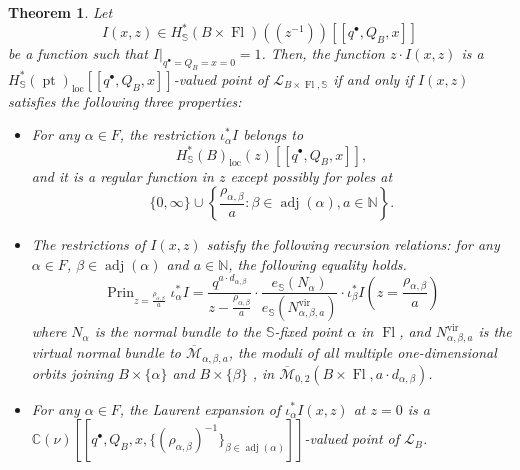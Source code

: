 \documentclass[a4paper,12pt]{amsart}
\numberwithin{equation}{section}
\newtheorem{theorem}{Theorem}[section]
\theoremstyle{definition}
\newcommand{\C}{\mathbb{C}}
\newcommand{\N}{\mathbb{N}}
\newcommand{\bbS}{\mathbb{S}}
\newcommand{\cL}{\mathcal{L}}
\newcommand{\cM}{\mathcal{M}}
\newcommand{\ovcM}{\overline{\cM}}
\newcommand{\adj}{\operatorname{adj}}
\newcommand{\loc}{{\operatorname{loc}}}
\newcommand{\pt}{\operatorname{pt}}
\newcommand{\vir}{{\operatorname{vir}}}
\newcommand{\FlG}{\operatorname{Fl}}
\newcommand{\Prin}{\operatorname{Prin}}
\begin{document}
\begin{theorem}\label{thm:characterization}
    Let 
    \[
    I(x,z)\in H^*_\bbS(B\times\FlG)(\!(z^{-1})\!)[\![q^\bullet,Q_B,x]\!]
    \]
    be a function such that $I|_{q^\bullet=Q_B=x=0}=1$.
    Then, the function $z\cdot I(x,z)$ is a $H^*_\bbS(\pt)_\loc[\![q^\bullet,Q_B,x]\!]$-valued point of $\cL_{B\times\FlG,\bbS}$ if and only if $I(x,z)$ satisfies the following three properties:
    \begin{itemize}
        \item[$\mathbf{(C1)}$]
        For any $\alpha\in F$, the restriction $\iota_\alpha^*I$ belongs to
        \[
         H^*_{\bbS}(B)_\loc (z) [\![q^\bullet,Q_B,x]\!],
        \]
        and it is a regular function in $z$ except possibly for poles at
        \[
        \{0,\infty\} \cup \left\{ \frac{\rho_{\alpha,\beta}}{a} \colon \beta\in\adj(\alpha), a\in\N \right\}.
        \]
        
        \item[$\mathbf{(C2)}$]
        The restrictions of $I(x,z)$ satisfy the following recursion relations: for any $\alpha\in F$, $\beta\in\adj(\alpha)$ and $a\in\N$, the following equality holds.
        \[
        \Prin_{z=\frac{\rho_{\alpha,\beta}}{a}} \iota_\alpha^*I = \frac{q^{a\cdot d_{\alpha,\beta}}}{z-\frac{\rho_{\alpha,\beta}}{a}} \cdot \frac{e_\bbS(N_\alpha)}{e_\bbS(N^\vir_{\alpha,\beta,a})} \cdot \iota_\beta^*I\left( z=\frac{\rho_{\alpha,\beta}}{a} \right)
        \]
        where $N_\alpha$ is the normal bundle to the $\bbS$-fixed point $\alpha$ in $\FlG$, and $N^\vir_{\alpha,\beta,a}$ is the virtual normal bundle to $\ovcM_{\alpha,\beta,a}$, the moduli of all multiple one-dimensional orbits joining $B\times\{\alpha\}$ and $B\times\{\beta\}$ \cite[Definition 3.10]{Koto:mirror}, in $\ovcM_{0,2}(B\times\FlG,a\cdot d_{\alpha,\beta})$.
        
        \item[$\mathbf{(C3)}$]
        For any $\alpha\in F$, the Laurent expansion of $\iota_\alpha^*I(x,z)$ at $z=0$ is a $\C(\nu)[\![q^\bullet,Q_B,x,\{(\rho_{\alpha,\beta})^{-1}\}_{\beta\in\adj(\alpha)}]\!]$-valued point of $\cL_B$.
    \end{itemize}
\end{theorem}
\end{document}
